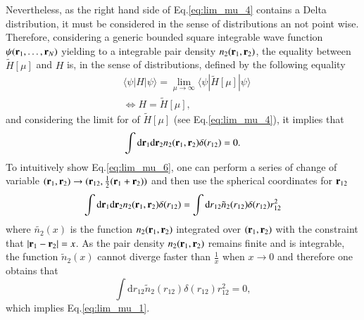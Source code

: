 \documentclass[aip,jcp,reprint,noshowkeys,superscriptaddress]{revtex4-1}
\newcommand{\matelem}[3]{\langle #1 | #2 | #3 \rangle}
\newcommand{\br}[0]{{\bf {r}}}
\begin{document}
Nevertheless, as the right hand side of Eq.\eqref{eq:lim_mu_4} contains a Delta distribution, it must be considered in the sense of distributions an not point wise. 
Therefore, considering a generic bounded square integrable wave function $\psi(\br{}_1,\hdots,\br{}_N)$ yielding to a integrable pair density $n_2(\br{}_1,\br{}_2)$, the equality between $\tilde{H}[\mu]$ and $H$ is, in the sense of distributions, defined by the following equality 
\begin{equation}
 \label{eq:lim_mu_5}
 \begin{aligned}
& \matelem{\psi}{H}{\psi} = \lim_{\mu \rightarrow \infty} \matelem{\psi}{\tilde{H}[\mu]}{\psi} \\
& \Leftrightarrow H = \tilde{H}[\mu],
 \end{aligned}
\end{equation}
and considering the limit for of $\tilde{H}[\mu]$ (see Eq.\eqref{eq:lim_mu_4}), it implies that 
\begin{equation}
 \label{eq:lim_mu_6}
 \int \text{d}\br{}_1 \text{d}\br{}_2 n_2(\br{}_1,\br{}_2) \delta(r_{12}) = 0.
\end{equation}
To intuitively show Eq.\eqref{eq:lim_mu_6}, one can perform a series of change of variable $(\br{}_1,\br{}_2)\rightarrow (\br{}_{12},\frac{1}{2}(\br{}_1 + \br{}_2))$ and then use the spherical coordinates for $\br{}_{12}$ 
\begin{equation}
 \int \text{d}\br{}_1 \text{d}\br{}_2 n_2(\br{}_1,\br{}_2) \delta(r_{12}) = \int \text{d}r{}_{12}  \tilde{n}_2(r_{12}) \delta(r_{12}) r_{12}^2 
\end{equation}
where $\tilde{n_2}(x)$ is the function $n_2(\br{}_1,\br{}_2)$ integrated over $(\br{}_1,\br{}_2)$ with the constraint that 
$|\br{}_1-\br{}_2| = x$. 
As the pair density $n_2(\br{}_1,\br{}_2)$ remains finite and is integrable, the function $\tilde{n}_2(x)$ 
cannot diverge faster than $\frac{1}{x}$ when $x\rightarrow 0$ and therefore one obtains that 
\begin{equation}
 \int \text{d}r{}_{12}  \tilde{n}_2(r_{12}) \delta(r_{12}) r_{12}^2 = 0,
\end{equation}
which implies Eq.\eqref{eq:lim_mu_1}. 
\end{document}
